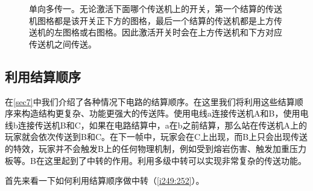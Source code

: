 \begin{figure}[!ht]
\begin{center}
\qquad
{}
\end{center}
\caption{单向多传一。无论激活下面哪个传送机上的开关，第一个结算的传送机图格都是该开关正下方的图格，最后一个结算的传送机都是上方传送机的左图格或右图格。因此激活开关时会在上方传送机和下方对应传送机之间传送。}
\label{i247:248}
\end{figure}

\subsection{利用结算顺序}
在\autoref{sec7}中我们介绍了各种情况下电路的结算顺序。在这里我们将利用这些结算顺序来构造结构更复杂、功能更强大的传送阵。使用电线a连接传送机A和B，使用电线b连接传送机B和C，如果在电路结算中，a在b之前结算，那么站在传送机A上的玩家就会依次传送到B和C。在下一帧中，玩家会在C上出现，而B上只会出现传送的特效，玩家并不会触发B上的任何物理机制，例如受到熔岩伤害、触发加重压力板等。B在这里起到了中转的作用。利用多级中转可以实现非常复杂的传送功能。

首先来看一下如何利用结算顺序做中转（\autoref{i249:252}）。

